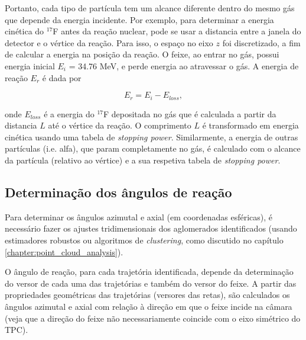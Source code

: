 \documentclass[a4paper,12pt,oneside]{book}
\begin{document}
\par Portanto, cada tipo de partícula tem um alcance diferente dentro do mesmo gás que depende da energia incidente. Por exemplo, para determinar a energia cinética do $^{17}$F antes da reação nuclear, pode se usar a distancia entre a janela do detector e o vértice da reação. Para isso, o espaço no eixo $z$ foi discretizado, a fim de calcular a energia na posição da reação. O feixe, ao entrar no gás, possui energia inicial $E_i$ = 34.76 MeV, e perde energia ao atravessar o gás. A energia de reação $E_r$ é dada por

\begin{equation}
	E_r = E_i - E_{loss},
\end{equation}

\par onde $E_{loss}$ é a energia do $^{17}$F depositada no gás que é calculada a partir da distancia $L$ até o vértice da reação. O comprimento $L$ é transformado em energia cinética usando uma tabela de \textit{stopping power}. Similarmente, a energia de outras partículas (i.e. alfa), que param completamente no gás, é calculado com o alcance da partícula (relativo ao vértice) e a sua respetiva tabela de \textit{stopping power}.


\subsection{Determinação dos ângulos de reação}

\par Para determinar os ângulos azimutal e axial (em coordenadas esféricas), é necessário fazer os ajustes tridimensionais dos aglomerados identificados (usando estimadores robustos ou algoritmos de \textit{clustering}, como discutido no capítulo \ref{chapter:point_cloud_analysis}).

\par O ângulo de reação, para cada trajetória identificada, depende da determinação do versor de cada uma das trajetórias e também do versor do feixe. A partir das propriedades geométricas das trajetórias (versores das retas), são calculados os ângulos azimutal e axial com relação à direção em que o feixe incide na câmara (veja que a direção do feixe não necessariamente coincide com o eixo simétrico do TPC).
\end{document}
